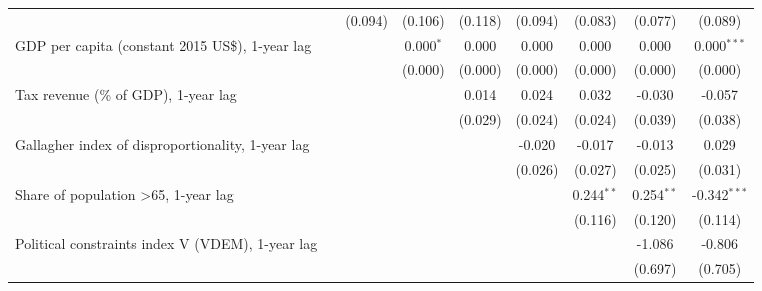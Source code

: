 \begin{table}[htbp]
\begin{tabular}{lcccccccc}
                                                                               &                & (0.094)        & (0.106)        & (0.118)        & (0.094)        & (0.083)        & (0.077)       & (0.089)\\   
      GDP per capita (constant 2015 US\$), 1-year lag                          &                &                & 0.000$^{*}$    & 0.000          & 0.000          & 0.000          & 0.000         & 0.000$^{***}$\\   
                                                                               &                &                & (0.000)        & (0.000)        & (0.000)        & (0.000)        & (0.000)       & (0.000)\\   
      Tax revenue (\% of GDP), 1-year lag                                      &                &                &                & 0.014          & 0.024          & 0.032          & -0.030        & -0.057\\   
                                                                               &                &                &                & (0.029)        & (0.024)        & (0.024)        & (0.039)       & (0.038)\\   
      Gallagher index of disproportionality, 1-year lag                        &                &                &                &                & -0.020         & -0.017         & -0.013        & 0.029\\   
                                                                               &                &                &                &                & (0.026)        & (0.027)        & (0.025)       & (0.031)\\   
      Share of population >65, 1-year lag                                      &                &                &                &                &                & 0.244$^{**}$   & 0.254$^{**}$  & -0.342$^{***}$\\   
                                                                               &                &                &                &                &                & (0.116)        & (0.120)       & (0.114)\\   
      Political constraints index V (VDEM), 1-year lag                         &                &                &                &                &                &                & -1.086        & -0.806\\   
                                                                               &                &                &                &                &                &                & (0.697)       & (0.705)\\   

\end{tabular}
\end{table}
